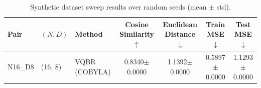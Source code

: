 \begin{table}[t]
\centering
\caption{Synthetic dataset sweep results over random seeds (mean $\pm$ std).}
\begin{tabular}{lllcccc}
\toprule
Pair & $(N, D)$ & Method & Cosine Similarity $\uparrow$ & Euclidean Distance $\downarrow$ & Train MSE $\downarrow$ & Test MSE $\downarrow$ \\
\midrule
N16_D8 & (16, 8) & VQBR (COBYLA) & 0.8340$\pm$0.0000 & 1.1392$\pm$0.0000 & 0.5897$\pm$0.0000 & 1.1293$\pm$0.0000 \\
\bottomrule
\end{tabular}
\end{table}

